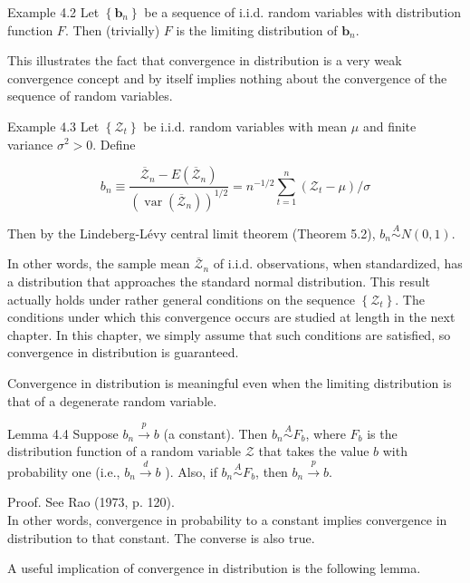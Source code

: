\documentclass[10pt]{article}
\begin{document}
Example 4.2 Let $\left\{\mathbf{b}_{n}\right\}$ be a sequence of i.i.d. random variables with distribution function $F$. Then (trivially) $F$ is the limiting distribution of $\mathbf{b}_{n}$.

This illustrates the fact that convergence in distribution is a very weak convergence concept and by itself implies nothing about the convergence of the sequence of random variables.

Example 4.3 Let $\left\{\mathcal{Z}_{t}\right\}$ be i.i.d. random variables with mean $\mu$ and finite variance $\sigma^{2}>0$. Define

$$
b_{n} \equiv \frac{\overline{\mathcal{Z}}_{n}-E\left(\overline{\mathcal{Z}}_{n}\right)}{\left(\operatorname{var}\left(\overline{\mathcal{Z}}_{n}\right)\right)^{1 / 2}}=n^{-1 / 2} \sum_{t=1}^{n}\left(\mathcal{Z}_{t}-\mu\right) / \sigma
$$

Then by the Lindeberg-Lévy central limit theorem (Theorem 5.2), $b_{n} \stackrel{A}{\sim} N(0,1)$.

In other words, the sample mean $\overline{\mathcal{Z}}_{n}$ of i.i.d. observations, when standardized, has a distribution that approaches the standard normal distribution. This result actually holds under rather general conditions on the sequence $\left\{\mathcal{Z}_{t}\right\}$. The conditions under which this convergence occurs are studied at length in the next chapter. In this chapter, we simply assume that such conditions are satisfied, so convergence in distribution is guaranteed.

Convergence in distribution is meaningful even when the limiting distribution is that of a degenerate random variable.

Lemma 4.4 Suppose $b_{n} \xrightarrow{p} b$ (a constant). Then $b_{n} \stackrel{A}{\sim} F_{b}$, where $F_{b}$ is the distribution function of a random variable $\mathcal{Z}$ that takes the value $b$ with probability one (i.e., $b_{n} \xrightarrow{d} b$ ). Also, if $b_{n} \stackrel{A}{\sim} F_{b}$, then $b_{n} \xrightarrow{p} b$.

Proof. See Rao (1973, p. 120).\\
In other words, convergence in probability to a constant implies convergence in distribution to that constant. The converse is also true.

A useful implication of convergence in distribution is the following lemma.
\end{document}
